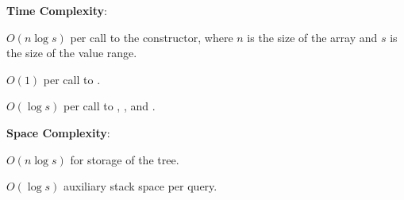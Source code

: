 \textbf{Time Complexity}:
\begin{compactitem}
  \item $O(n \log s)$ per call to the constructor, where $n$ is the size of the array and $s$ is the size of the value range.
  \item $O(1)$ per call to .
  \item $O(\log s)$ per call to , , and .
\end{compactitem}

\textbf{Space Complexity}:
\begin{compactitem}
  \item $O(n \log s)$ for storage of the tree.
  \item $O(\log s)$ auxiliary stack space per query.
\end{compactitem}


